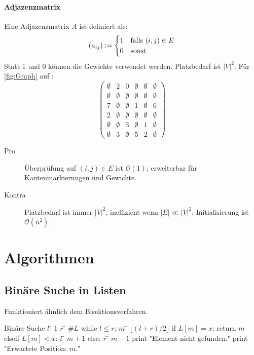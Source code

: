 \subsubsection{Adjazenzmatrix}
Eine Adjazenzmatrix $A$ ist definiert als:
\[
  (a_{ij}) := \begin{cases}
    1 & \hbox{falls $(i,j) \in E$} \\
    0 & \hbox{sonst}
  \end{cases}
\]
Statt 1 und 0 können die Gewichte verwendet werden.
Platzbedarf ist $\lvert V \rvert^2$.
Für \cref{fig:Graph} auf :
\[
  \begin{pmatrix}
    \emptyset & 2         & 0         & \emptyset & \emptyset & \emptyset\\
    \emptyset & \emptyset & \emptyset & \emptyset & \emptyset & \emptyset\\
    7         & \emptyset & \emptyset & 1         & \emptyset & 6        \\
    2         & \emptyset & \emptyset & \emptyset & \emptyset & \emptyset\\
    \emptyset & \emptyset & 3         & \emptyset & 1         & \emptyset\\
    \emptyset & 3         & \emptyset & 5         & 2         & \emptyset
  \end{pmatrix}
\]

\begin{description}
  \item[Pro] Überprüfung auf $(i,j) \in E$ ist $\mathcal{O}(1)$; erweiterbar für Kantenmarkierungen und Gewichte.
  \item[Kontra] Platzbedarf ist immer $\lvert V \rvert^2$, ineffizient wenn $\lvert E \rvert \ll \lvert V \rvert^2$; Initialisierung ist $\mathcal{O}(n^2)$.
\end{description}


\chapter{Algorithmen}
\section{Binäre Suche in Listen}
Funktioniert ähnlich dem Bisektionsverfahren.
\begin{mathalgo}{Binäre Suche}
$l$ \= $1$
$r$ \= $\#L$
while $l \leq r$:
\> $m$ \= $\lfloor(l+r)/2\rfloor$
\> if $L[m] = x$:
\>\> return $m$
\> elseif $L[m] < x$:
\>\> $l$ \= $m + 1$
\> else: 
\>\> $r$ \= $m - 1$
print "{}Element nicht gefunden."
print "{}Erwartete Position: \textdollar$m$."
\end{mathalgo}

